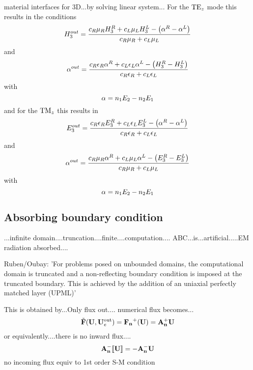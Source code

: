 material interfaces for 3D...by solving linear system...
For the $\textrm{TE}_{z}$ mode this results in the conditions
\begin{equation}
H_3^{out} = \frac{c_{R} \mu_R H_3^R + c_{L} \mu_L H_3^L - \left(\alpha^R - \alpha^L \right)}{c_{R} \mu_R + c_{L} \mu_L } \label{eq:interface-bc-V3}
\end{equation}
and
\begin{equation}
\alpha^{out} = \frac{c_{R} \epsilon_R \alpha^R + c_{L} \epsilon_L \alpha^L - \left( H_3^R - H_3^L \right) }{c_{R} \epsilon_R + c_{L} \epsilon_L}
\end{equation}
with
$$ \alpha = n_1 E_2 - n_2 E_1 $$
and for the $\textrm{TM}_{z}$ this results in 
\begin{equation}
E_3^{out} = \frac{c_{R} \epsilon_R E_3^R + c_{L} \epsilon_L E_3^L - \left(\alpha^R - \alpha^L \right)}{c_{R} \epsilon_R + c_{L} \epsilon_L }
\end{equation}
and
\begin{equation}
\alpha^{out} = \frac{c_{R} \mu_R \alpha^R + c_{L} \mu_L \alpha^L - \left( E_3^R - E_3^L \right) }{c_{R} \mu_R + c_{L} \mu_L}
\end{equation}
with $$ \alpha = n_1 E_2 - n_2 E_1 $$

\subsection{Absorbing boundary condition}
...infinite
domain....truncation....finite....computation....
ABC...is...artificial.....EM radiation absorbed....

Ruben/Oubay: 'For problems posed on unbounded domains, the computational
domain is truncated and a non-reflecting boundary
condition is imposed at the truncated boundary. This is achieved
by the addition of an uniaxial perfectly matched layer (UPML)'

This is obtained by...Only flux out....
numerical flux becomes...
\begin{align}
\tilde{\mathbf{F}}(\mathbf{U},\mathbf{U}_e^{\textrm{out}}) = \mathbf{\mathbf{F}_n}^+(\mathbf{U}) = \mathbf{A}_\mathbf{n}^{+} \mathbf{U}
\end{align}
or equivalently....there is no inward flux....
$$
\mathbf{A}_\mathbf{n}^{-} \llbracket \mathbf{U} \rrbracket = - \mathbf{A}_\mathbf{n}^{-} \mathbf{U}
$$
no incoming flux equiv to 1st order S-M condition

